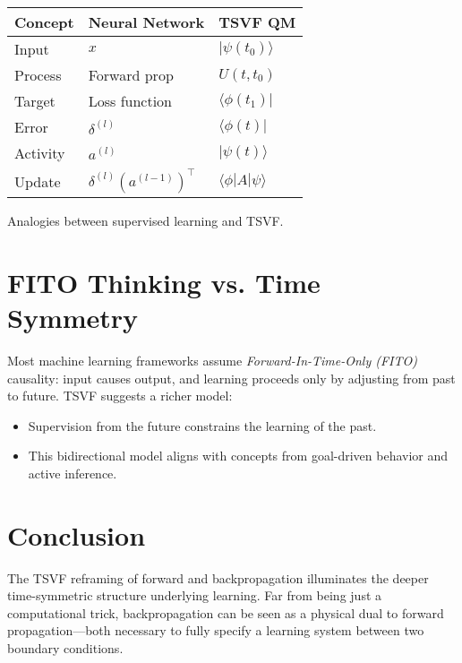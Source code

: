\documentclass[../../../OAE-SPEC-MAIN.tex]{subfiles}
\begin{document}
\begin{margintable}
\footnotesize
\setlength{\tabcolsep}{3pt}
\begin{tabular}{@{}p{1.5cm}p{1.3cm}p{1.3cm}@{}}
\toprule
\textbf{Concept} & \textbf{Neural Network} & \textbf{TSVF QM} \\
\midrule
Input & \(x\) & \(|\psi(t_0)\rangle\) \\
Process & Forward prop & \(U(t, t_0)\) \\
Target & Loss function & \(\langle\phi(t_1)|\) \\
Error & \(\delta^{(l)}\) & \(\langle\phi(t)|\) \\
Activity & \(a^{(l)}\) & \(|\psi(t)\rangle\) \\
Update & \(\delta^{(l)} (a^{(l-1)})^\top\) & \(\langle \phi | A | \psi \rangle\) \\
\bottomrule
\end{tabular}
\caption{Analogies between supervised learning and TSVF.}
\end{margintable}

\section{FITO Thinking vs. Time Symmetry}

Most machine learning frameworks assume \emph{Forward-In-Time-Only (FITO)} causality: input causes output, and learning proceeds only by adjusting from past to future. TSVF suggests a richer model:

\begin{itemize}
  \item Supervision from the future constrains the learning of the past.
  \item This bidirectional model aligns with concepts from goal-driven behavior and active inference.
\end{itemize}


\section{Conclusion}

The TSVF reframing of forward and backpropagation illuminates the deeper time-symmetric structure underlying learning. Far from being just a computational trick, backpropagation can be seen as a physical dual to forward propagation—both necessary to fully specify a learning system between two boundary conditions.
\end{document}
